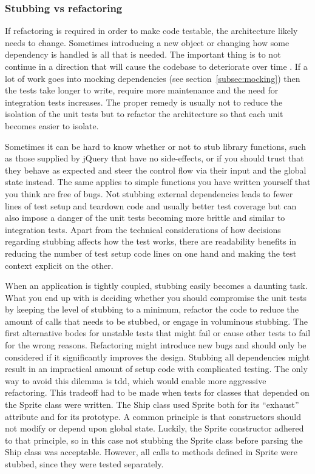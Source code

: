 \documentclass[11pt]{article}
\begin{document}
\label{subsec:coveragecriteria}

\subsubsection{Stubbing vs refactoring}

If refactoring is required in order to make code testable, the architecture likely needs to change. Sometimes introducing a new object or changing how some dependency is handled is all that is needed. The important thing is to not continue in a direction that will cause the codebase to deteriorate over time \cite[question~34]{Stenmark}. If a lot of work goes into mocking dependencies (see section~\ref{subsec:mocking}) then the tests take longer to write, require more maintenance and the need for integration tests increases. The proper remedy is usually not to reduce the isolation of the unit tests but to refactor the architecture so that each unit becomes easier to isolate. \cite[question~42]{Stenmark}

Sometimes it can be hard to know whether or not to stub library functions, such as those supplied by jQuery that have no side-effects, or if you should trust that they behave as expected and steer the control flow via their input and the global state instead. The same applies to simple functions you have written yourself that you think are free of bugs. Not stubbing external dependencies leads to fewer lines of test setup and teardown code and usually better test coverage but can also impose a danger of the unit tests becoming more brittle and similar to integration tests. Apart from the technical considerations of how decisions regarding stubbing affects how the test works, there are readability benefits in reducing the number of test setup code lines on one hand and making the test context explicit on the other.

When an application is tightly coupled, stubbing easily becomes a daunting task. What you end up with is deciding whether you should compromise the unit tests by keeping the level of stubbing to a minimum, refactor the code to reduce the amount of calls that needs to be stubbed, or engage in voluminous stubbing. The first alternative bodes for unstable tests that might fail or cause other tests to fail for the wrong reasons. Refactoring might introduce new bugs and should only be considered if it significantly improves the design. Stubbing all dependencies might result in an impractical amount of setup code with complicated testing. The only way to avoid this dilemma is \gls{tdd}, which would enable more aggressive refactoring. This tradeoff had to be made when tests for classes that depended on the Sprite class were written. The Ship class used Sprite both for its ``exhaust'' attribute and for its prototype. A common principle is that constructors should not modify or depend upon global state. Luckily, the Sprite constructor adhered to that principle, so in this case not stubbing the Sprite class before parsing the Ship class was acceptable. However, all calls to methods defined in Sprite were stubbed, since they were tested separately.
\end{document}
